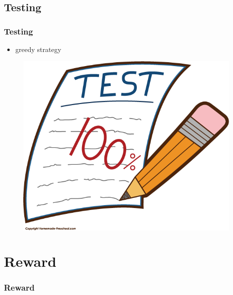 \documentclass{beamer}
\begin{document}
\subsection{Testing}
\begin{frame}
\frametitle{Testing}
	\begin{itemize}
		\item {greedy strategy}
	\end{itemize}
\begin{figure}
	\centering
	\includegraphics[width=0.4\linewidth]{../Images/Test2}
	\label{fig:test2}
\end{figure}

\end{frame}
\section{Reward}
\begin{frame}
\frametitle{Reward}	
\end{frame}
\end{document}
